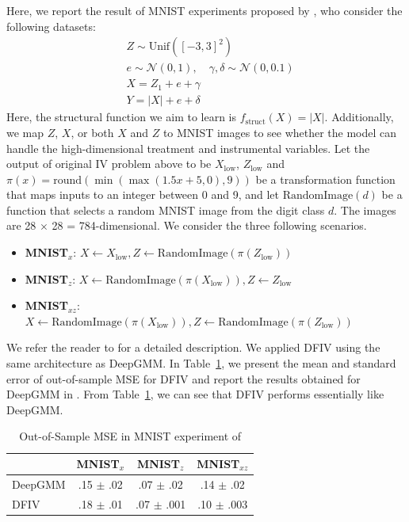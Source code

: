 Here, we report the result of MNIST experiments proposed by \citet{Bennett2019}, who consider the following datasets:
\begin{align*}
    &Z \sim \mathrm{Unif}([-3,3]^2)\\
    &e \sim \mathcal{N}(0,1), \quad \gamma,\delta \sim \mathcal{N}(0, 0.1)\\
    &X = Z_1 + e + \gamma\\
    &Y = |X| + e + \delta
\end{align*}
Here, the structural function we aim to learn is $f_{\mathrm{struct}}(X) = |X|$. Additionally, we map $Z$, $X$, or both $X$ and $Z$ to MNIST images to see whether the model can handle the high-dimensional treatment and instrumental variables. Let the output of original IV problem above to be $X_\mathrm{low}$, $Z_\mathrm{low}$ and
$\pi(x) = \mathrm{round}(\min(\max(1.5x+5, 0), 9))$ be a transformation function that maps inputs to an integer between 0 and 9, and let $\mathrm{RandomImage}(d)$ be a function that selects a random MNIST image from the digit class $d$. The images are 28 $\times$ 28 = 784-dimensional. We consider the three following scenarios.
\begin{itemize}
    \item \textbf{MNIST}${}_{x}$: $X \leftarrow X_{\mathrm{low}}, Z \leftarrow \mathrm{RandomImage}(\pi(Z_{\mathrm{low}}))$
    \item \textbf{MNIST}${}_{z}$: $X \leftarrow \mathrm{RandomImage}(\pi(X_{\mathrm{low}})), Z \leftarrow Z_{\mathrm{low}}$
    \item \textbf{MNIST}${}_{xz}$: $X \leftarrow \mathrm{RandomImage}(\pi(X_{\mathrm{low}})), Z \leftarrow \mathrm{RandomImage}(\pi(Z_{\mathrm{low}}))$
\end{itemize}
We refer the reader to \citet{Bennett2019} for a detailed description. We applied DFIV using the same architecture as DeepGMM. In Table~\ref{tab:mnist-experiments}, we present the mean and standard error of out-of-sample MSE for DFIV and report the results obtained for DeepGMM in \citet{Bennett2019}. From Table~\ref{tab:mnist-experiments}, we can see that DFIV performs essentially like DeepGMM.

\begin{table}
    \centering
    \begin{tabular}{lccc}
         &  \textbf{MNIST}${}_{x}$ &\textbf{MNIST}${}_{z}$ & \textbf{MNIST}${}_{xz}$  \\ \hline
        DeepGMM &.15 $\pm$ .02 &.07 $\pm$ .02& .14 $\pm$ .02\\
        DFIV &.18 $\pm$ .01 &  .07 $\pm$ .001 & .10 $\pm$ .003
    \end{tabular}
    \caption{Out-of-Sample MSE in MNIST experiment of \citet{Bennett2019}}
    \label{tab:mnist-experiments}
\end{table}